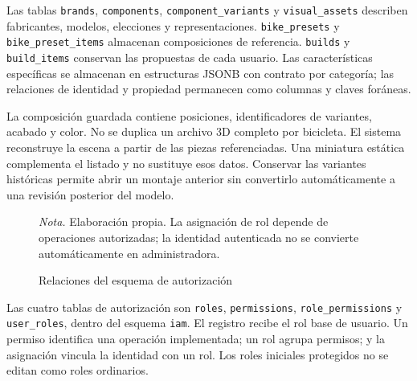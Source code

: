 \documentclass[12pt,letterpaper]{article}
\newcommand{\nota}[1]{\par{\normalfont\normalsize\doublespacing\raggedright\setlength{\parindent}{0pt}\noindent\textit{Nota.} #1\par}}
\newcommand{\ruta}[1]{{\urlstyle{tt}\nolinkurl{#1}}}
\begin{document}
Las tablas \ruta{brands}, \ruta{components}, \ruta{component_variants} y \ruta{visual_assets} describen fabricantes, modelos, elecciones y representaciones. \ruta{bike_presets} y \ruta{bike_preset_items} almacenan composiciones de referencia. \ruta{builds} y \ruta{build_items} conservan las propuestas de cada usuario. Las características específicas se almacenan en estructuras JSONB con contrato por categoría; las relaciones de identidad y propiedad permanecen como columnas y claves foráneas.

La composición guardada contiene posiciones, identificadores de variantes, acabado y color. No se duplica un archivo 3D completo por bicicleta. El sistema reconstruye la escena a partir de las piezas referenciadas. Una miniatura estática complementa el listado y no sustituye esos datos. Conservar las variantes históricas permite abrir un montaje anterior sin convertirlo automáticamente a una revisión posterior del modelo.

\begin{figure}[H]
\caption{Relaciones del esquema de autorización}\label{fig:iam}
\centering


\nota{Elaboración propia. La asignación de rol depende de operaciones autorizadas; la identidad autenticada no se convierte automáticamente en administradora.}
\end{figure}

Las cuatro tablas de autorización son \ruta{roles}, \ruta{permissions}, \ruta{role_permissions} y \ruta{user_roles}, dentro del esquema \ruta{iam}. El registro recibe el rol base de usuario. Un permiso identifica una operación implementada; un rol agrupa permisos; y la asignación vincula la identidad con un rol. Los roles iniciales protegidos no se editan como roles ordinarios.
\end{document}

